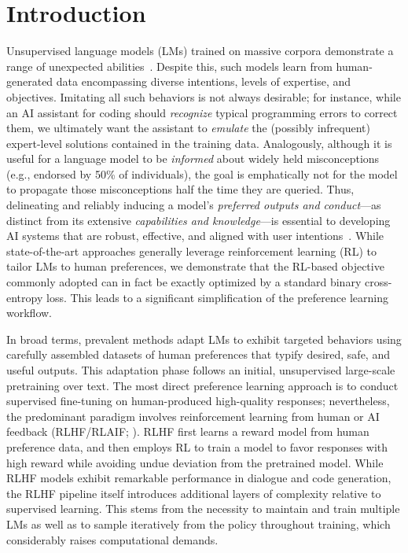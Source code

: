 \section{Introduction}
Unsupervised language models (LMs) trained on massive corpora demonstrate a range of unexpected abilities~\citep{chowdhery2022palm, brown2020language, touvron2023llama, bubeck2023sparks}. Despite this, such models learn from human-generated data encompassing diverse intentions, levels of expertise, and objectives. Imitating all such behaviors is not always desirable; for instance, while an AI assistant for coding should \textit{recognize} typical programming errors to correct them, we ultimately want the assistant to \textit{emulate} the (possibly infrequent) expert-level solutions contained in the training data. Analogously, although it is useful for a language model to be \textit{informed} about widely held misconceptions (e.g., endorsed by 50\% of individuals), the goal is emphatically not for the model to propagate those misconceptions half the time they are queried. Thus, delineating and reliably inducing a model’s \emph{preferred outputs and conduct}—as distinct from its extensive \textit{capabilities and knowledge}—is essential to developing AI systems that are robust, effective, and aligned with user intentions~\citep{ouyang2022training}. While state-of-the-art approaches generally leverage reinforcement learning (RL) to tailor LMs to human preferences, we demonstrate that the RL-based objective commonly adopted can in fact be exactly optimized by a standard binary cross-entropy loss. This leads to a significant simplification of the preference learning workflow.

In broad terms, prevalent methods adapt LMs to exhibit targeted behaviors using carefully assembled datasets of human preferences that typify desired, safe, and useful outputs. This adaptation phase follows an initial, unsupervised large-scale pretraining over text. The most direct preference learning approach is to conduct supervised fine-tuning on human-produced high-quality responses; nevertheless, the predominant paradigm involves reinforcement learning from human or AI feedback (RLHF/RLAIF; \citep{christiano2017deep, bai2022constitutional}). RLHF first learns a reward model from human preference data, and then employs RL to train a model to favor responses with high reward while avoiding undue deviation from the pretrained model. While RLHF models exhibit remarkable performance in dialogue and code generation, the RLHF pipeline itself introduces additional layers of complexity relative to supervised learning. This stems from the necessity to maintain and train multiple LMs as well as to sample iteratively from the policy throughout training, which considerably raises computational demands.

